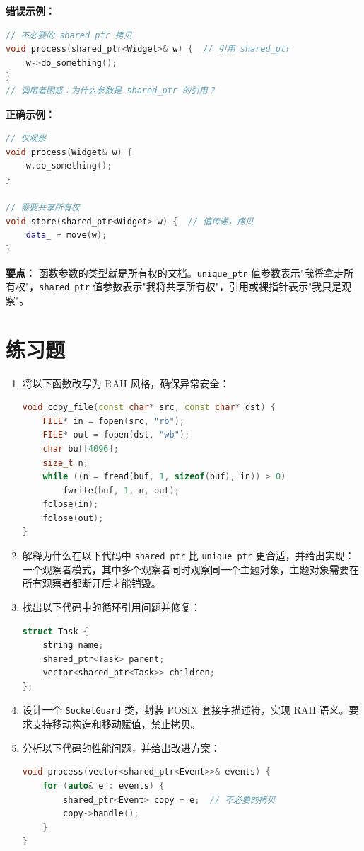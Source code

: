 \textbf{错误示例：}

\begin{lstlisting}[language=C++]
// 不必要的 shared_ptr 拷贝
void process(shared_ptr<Widget>& w) {  // 引用 shared_ptr
    w->do_something();
}
// 调用者困惑：为什么参数是 shared_ptr 的引用？
\end{lstlisting}

\textbf{正确示例：}

\begin{lstlisting}[language=C++]
// 仅观察
void process(Widget& w) {
    w.do_something();
}

// 需要共享所有权
void store(shared_ptr<Widget> w) {  // 值传递，拷贝
    data_ = move(w);
}
\end{lstlisting}

\textbf{要点：} 函数参数的类型就是所有权的文档。\texttt{unique\_ptr} 值参数表示"我将拿走所有权"，\texttt{shared\_ptr} 值参数表示"我将共享所有权"，引用或裸指针表示"我只是观察"。

\section*{练习题}

\begin{enumerate}
\item 将以下函数改写为 RAII 风格，确保异常安全：
\begin{lstlisting}[language=C++]
void copy_file(const char* src, const char* dst) {
    FILE* in = fopen(src, "rb");
    FILE* out = fopen(dst, "wb");
    char buf[4096];
    size_t n;
    while ((n = fread(buf, 1, sizeof(buf), in)) > 0)
        fwrite(buf, 1, n, out);
    fclose(in);
    fclose(out);
}
\end{lstlisting}

\item 解释为什么在以下代码中 \texttt{shared\_ptr} 比 \texttt{unique\_ptr} 更合适，并给出实现：一个观察者模式，其中多个观察者同时观察同一个主题对象，主题对象需要在所有观察者都断开后才能销毁。

\item 找出以下代码中的循环引用问题并修复：
\begin{lstlisting}[language=C++]
struct Task {
    string name;
    shared_ptr<Task> parent;
    vector<shared_ptr<Task>> children;
};
\end{lstlisting}

\item 设计一个 \texttt{SocketGuard} 类，封装 POSIX 套接字描述符，实现 RAII 语义。要求支持移动构造和移动赋值，禁止拷贝。

\item 分析以下代码的性能问题，并给出改进方案：
\begin{lstlisting}[language=C++]
void process(vector<shared_ptr<Event>>& events) {
    for (auto& e : events) {
        shared_ptr<Event> copy = e;  // 不必要的拷贝
        copy->handle();
    }
}
\end{lstlisting}
\end{enumerate}


